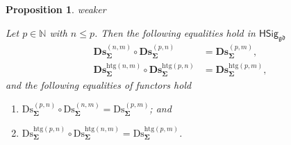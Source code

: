 \documentclass[a4paper, reqno]{amsbook}
\makeatletter
\newcommand{\sig}[1]{\mathbf{#1}}             %
\newcommand{\gd}{\mathfrak{gd}}              %
\newcommand{\htg}{\mathrm{htg}}                %
\newcommand{\Ds}{\mathrm{Ds}}
\newcommand{\bDs}{\mathbf{Ds}}
\theoremstyle{plain}
\newtheorem{proposition}[theorem]{Proposition}
\theoremstyle{definition}
\newcommand*{\CA@leanpending}{}
\newcommand*{\CA@leanrelation}{}
\newcommand*{\lean}[2]{%
  \ifcsname\string\color@lean@#1\endcsname\else
    \PackageError{main}{Unknown relation `#1' in \string\lean}{Use equivalent, weaker or stronger.}%
  \fi
  \gdef\CA@leanrelation{#1}%
  \gdef\CA@leanpending{#2}}
\makeatother
\begin{document}
\begin{proposition}\label{PDsDerivorComp}\lean{weaker}{Dimensions.homogeneousDiscretization_comp,Dimensions.heterogeneousDiscretization_comp,Dimensions.homogeneousDiscretizationFunctorComp,Dimensions.heterogeneousDiscretizationFunctorComp}
Let $p\in\mathbb{N}$ with $n\leq p$.
Then the following equalities hold in $\mathsf{HSig}_{\gd}$
\begin{align*}
\bDs^{(n,m)}_{\sig{\Sigma}}\circ\bDs^{(p,n)}_{\sig{\Sigma}}&=\bDs^{(p,m)}_{\sig{\Sigma}},\\
\bDs^{\htg(n,m)}_{\sig{\Sigma}}\circ\bDs^{\htg(p,n)}_{\sig{\Sigma}}&=\bDs^{\htg(p,m)}_{\sig{\Sigma}},
\end{align*}
and the following equalities of functors hold
\begin{enumerate}
	\item
	$\Ds^{(p,n)}_{\sig{\Sigma}}\circ\Ds^{(n,m)}_{\sig{\Sigma}}=\Ds^{(p,m)}_{\sig{\Sigma}}$; and

	\item
	$\Ds^{\htg(p,n)}_{\sig{\Sigma}}\circ\Ds^{\htg(n,m)}_{\sig{\Sigma}}=\Ds^{\htg(p,m)}_{\sig{\Sigma}}$.
\end{enumerate}
\end{proposition}
\end{document}
